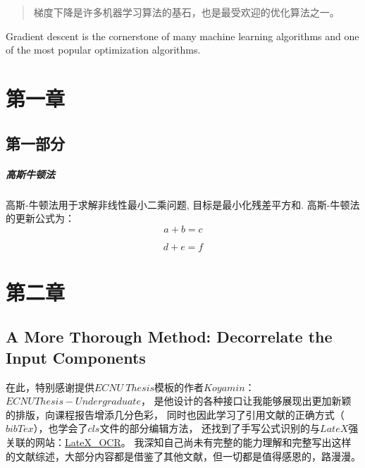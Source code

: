 \documentclass[printMode=false, declarePage=false]{ecnuthesis}
\date{} %
\begin{document}
    \tableofcontents

    \frontmatter

    \begin{abstract}
        梯度下降是许多机器学习算法的基石，也是最受欢迎的优化算法之一。
    \end{abstract}

    \begin{abstractEN}
        Gradient descent is the cornerstone of many machine learning algorithms and one of the most popular optimization algorithms.
    \end{abstractEN}

    \mainmatter

    \chapter{第一章}

    \section{第一部分}

    \paragraph{高斯牛顿法}

    高斯-牛顿法用于求解非线性最小二乘问题, 目标是最小化残差平方和.\cite{lai2017solving}
    高斯-牛顿法的更新公式为：
    \begin{equation}
        a+b=c
    \end{equation}

    \begin{equation}
        d+e=f
    \end{equation}

    \chapter{第二章}

    \section*{A More Thorough Method: Decorrelate the Input Components\cite{hinton2012neural}}

    \backmatter

    \begin{acknowledgement}
        在此，特别感谢提供$ECNU\ Thesis$模板的作者$Koyamin$：
        \href{https://github.com/Koyamin/ECNUThesis-Undergraduate}{$ECNUThesis-Undergraduate$}，
        是他设计的各种接口让我能够展现出更加新颖的排版，向课程报告增添几分色彩，
        同时也因此学习了引用文献的正确方式（$bibTex$），也学会了$cls$文件的部分编辑方法，
        还找到了手写公式识别的与$LateX$强关联的网站：\href{https://simpletex.cn/ai/latex_ocr}{LateX\_OCR}。
        我深知自己尚未有完整的能力理解和完整写出这样的文献综述，大部分内容都是借鉴了其他文献，但一切都是值得感恩的，路漫漫。
    \end{acknowledgement}
\end{document}
